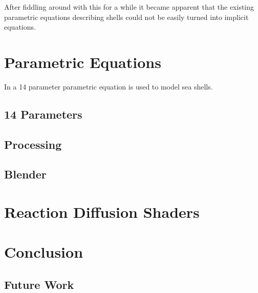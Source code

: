 \documentclass[a4paper]{article}
\begin{document}
After fiddling around with this for a while it became apparent that the existing parametric equations describing shells could not be easily turned into implicit equations.

\section{Parametric Equations}

In \cite{JORGEPICADO} a 14 parameter parametric equation is used to model sea shells.

\subsection{14 Parameters} 

\subsection{Processing}

\subsection{Blender}

\section{Reaction Diffusion Shaders}

\section{Conclusion}

\subsection{Future Work}



\end{document}
